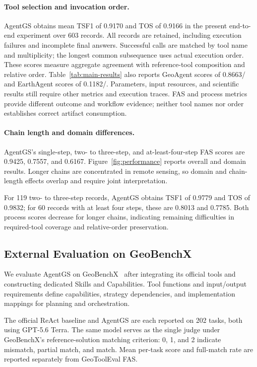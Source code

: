 \paragraph{Tool selection and invocation order.}
AgentGS obtains mean TSF1 of 0.9170 and TOS of 0.9166 in the present end-to-end experiment over 603 records. All records are retained, including execution failures and incomplete final answers. Successful calls are matched by tool name and multiplicity; the longest common subsequence uses actual execution order. These scores measure aggregate agreement with reference-tool composition and relative order. Table~\ref{tab:main-results} also reports GeoAgent scores of 0.8663/ and EarthAgent scores of 0.1182/. Parameters, input resources, and scientific results still require other metrics and execution traces. FAS and process metrics provide different outcome and workflow evidence; neither tool names nor order establishes correct artifact consumption.

\paragraph{Chain length and domain differences.}
AgentGS's single-step, two- to three-step, and at-least-four-step FAS scores are 0.9425, 0.7557, and 0.6167. Figure~\ref{fig:performance} reports overall and domain results. Longer chains are concentrated in remote sensing, so domain and chain-length effects overlap and require joint interpretation.

For 119 two- to three-step records, AgentGS obtains TSF1 of 0.9779 and TOS of 0.9832; for 60 records with at least four steps, these are 0.8013 and 0.7785. Both process scores decrease for longer chains, indicating remaining difficulties in required-tool coverage and relative-order preservation.


\subsection{External Evaluation on GeoBenchX}
\label{sec:external-evaluation}
We evaluate AgentGS on GeoBenchX~\cite{krechetova2025geobenchx} after integrating its official tools and constructing dedicated Skills and Capabilities. Tool functions and input/output requirements define capabilities, strategy dependencies, and implementation mappings for planning and orchestration.

The official ReAct baseline and AgentGS are each reported on 202 tasks, both using GPT-5.6 Terra. The same model serves as the single judge under GeoBenchX's reference-solution matching criterion: 0, 1, and 2 indicate mismatch, partial match, and match. Mean per-task score and full-match rate are reported separately from GeoToolEval FAS.

